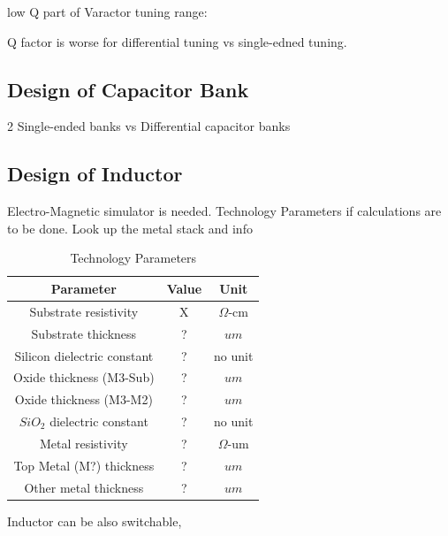 \documentclass{article}
\begin{document}
low Q part of Varactor tuning range: %

\begin{info}
	
\end{info}

Q factor is worse for differential tuning vs single-edned tuning.

\subsection{Design of Capacitor Bank} %

2 Single-ended banks vs Differential capacitor banks

\subsection{Design of Inductor}

Electro-Magnetic simulator is needed. Technology Parameters if calculations are to be done. Look up the metal stack and info %

\begin{table}[ht]
	\centering
	\begin{tabular}{|c|c|c|}
		\hline
		Parameter & Value & Unit \\
		\hline
		\hline
		Substrate resistivity & X & $\Omega$-\unit{cm}\\
		\hline
		Substrate thickness & ? & $um$ \\
		\hline
		Silicon dielectric constant & ? & no unit \\
		\hline
		Oxide thickness (M3-Sub) & ? & $um$ \\
		\hline
		Oxide thickness (M3-M2) & ? & $um$ \\
		\hline
		$SiO_2$ dielectric constant & ? & no unit \\
		\hline
		Metal resistivity & ? & $\Omega$-\unit{um} \\
		\hline
		Top Metal (M?) thickness & ? & $um$ \\
		\hline
		Other metal thickness& ? & $um$ \\
		\hline
	\end{tabular}
	\label{tech-param}
	\caption{Technology Parameters} 

\end{table}

Inductor can be also switchable, 

\end{document}
